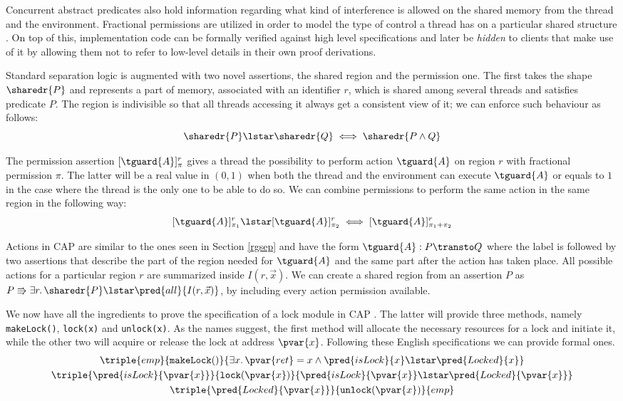 Concurrent abstract predicates also hold information regarding what kind of interference is allowed on the shared memory from the thread and the environment. Fractional permissions are utilized in order to model the type of control a thread has on a particular shared structure \cite{fractional}. On top of this, implementation code can be formally verified against high level specifications and later be \textit{hidden} to clients that make use of it by allowing them not to refer to low-level details in their own proof derivations.

Standard separation logic is augmented with two novel assertions, the shared region and the permission one. The first takes the shape $\sharedr{P}$ and represents a part of memory, associated with an identifier $r$, which is shared among several threads and satisfies predicate $P$. The region is indivisible so that all threads accessing it always get a consistent view of it; we can enforce such behaviour as follows:
\[
	\sharedr{P} \lstar \sharedr{Q} \iff \sharedr{P \land Q}
\]

The permission assertion $[\tguard{A}]_\pi^r$ gives a thread the possibility to perform action $\tguard{A}$ on region $r$ with fractional permission $\pi$. The latter will be a real value in $(0, 1)$ when both the thread and the environment can execute $\tguard{A}$ or equals to $1$ in the case where the thread is the only one to be able to do so. We can combine permissions to perform the same action in the same region in the following way:
\[
	[\tguard{A}]_{\pi_1}^r \lstar [\tguard{A}]_{\pi_2}^r \iff [\tguard{A}]_{\pi_1 + \pi_2}^r
\]

Actions in CAP are similar to the ones seen in Section \ref{rgsep} and have the form $\tguard{A}: P \transto Q$ where the label is followed by two assertions that describe the part of the region needed for $\tguard{A}$ and the same part after the action has taken place. All possible actions for a particular region $r$ are summarized inside $I(r, \vec{x})$. We can create a shared region from an assertion $P$ as $P \Rrightarrow \exists r \ldotp \sharedr{P} \lstar \pred{all}{I(r, \vec{x})}$, by including every action permission available.

We now have all the ingredients to prove the specification of a lock module in CAP \cite{cap}. The latter will provide three methods, namely \texttt{makeLock()}, \texttt{lock(x)} and \texttt{unlock(x)}. As the names suggest, the first method will allocate the necessary resources for a lock and initiate it, while the other two will acquire or release the lock at address $\pvar{x}$. Following these English specifications we can provide formal ones.
\begin{gather*}
\triple
{emp}
{\mathtt{makeLock}()}
{\exists x \ldotp \pvar{ret} = x \land \pred{isLock}{x} \lstar \pred{Locked}{x}}
\\
\triple
{\pred{isLock}{\pvar{x}}}
{\mathtt{lock}(\pvar{x})}
{\pred{isLock}{\pvar{x}} \lstar \pred{Locked}{\pvar{x}}}
\\
\triple
{\pred{Locked}{\pvar{x}}}
{\mathtt{unlock}(\pvar{x})}
{emp}
\end{gather*}

